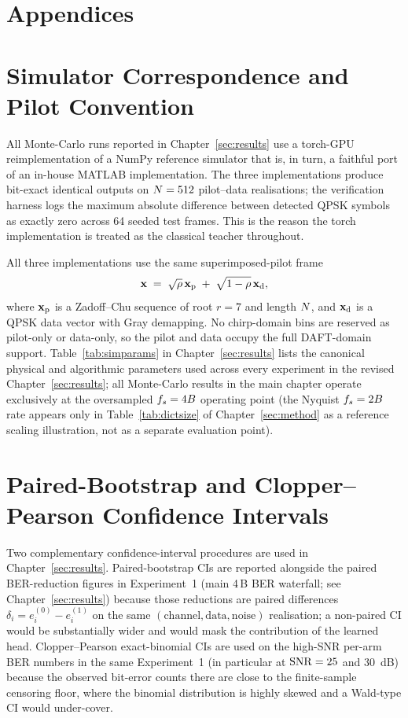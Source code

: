 \section*{Appendices}

\renewcommand{\thesection}{\Alph{section}}
\setcounter{section}{0}

\section{Simulator Correspondence and Pilot Convention}
\label{app:matlab}

All Monte-Carlo runs reported in Chapter~\ref{sec:results} use a torch-GPU reimplementation of a NumPy reference simulator that is, in turn, a faithful port of an in-house MATLAB implementation.
The three implementations produce bit-exact identical outputs on $N = 512$ pilot--data realisations; the verification harness logs the maximum absolute difference between detected QPSK symbols as exactly zero across 64 seeded test frames.
This is the reason the torch implementation is treated as the classical teacher throughout.

All three implementations use the same superimposed-pilot frame
\begin{equation*}
\mathbf{x} \;=\; \sqrt{\rho}\,\mathbf{x}_{\mathrm{p}} \;+\; \sqrt{1 - \rho}\,\mathbf{x}_{\mathrm{d}},
\end{equation*}
where $\mathbf{x}_{\mathrm{p}}$ is a Zadoff--Chu sequence of root $r = 7$ and length $N$, and $\mathbf{x}_{\mathrm{d}}$ is a QPSK data vector with Gray demapping.
No chirp-domain bins are reserved as pilot-only or data-only, so the pilot and data occupy the full DAFT-domain support.
Table~\ref{tab:simparams} in Chapter~\ref{sec:results} lists the canonical physical and algorithmic parameters used across every experiment in the revised Chapter~\ref{sec:results}; all Monte-Carlo results in the main chapter operate exclusively at the oversampled $f_s = 4B$ operating point (the Nyquist $f_s = 2B$ rate appears only in Table~\ref{tab:dictsize} of Chapter~\ref{sec:method} as a reference scaling illustration, not as a separate evaluation point).

\section{Paired-Bootstrap and Clopper--Pearson Confidence Intervals}
\label{app:ci}

Two complementary confidence-interval procedures are used in Chapter~\ref{sec:results}.
Paired-bootstrap CIs are reported alongside the paired BER-reduction figures in Experiment~1 (main 4\,B BER waterfall; see Chapter~\ref{sec:results}) because those reductions are paired differences $\delta_i = e^{(0)}_i - e^{(1)}_i$ on the same $(\mathrm{channel},\mathrm{data},\mathrm{noise})$ realisation; a non-paired CI would be substantially wider and would mask the contribution of the learned head.
Clopper--Pearson exact-binomial CIs are used on the high-SNR per-arm BER numbers in the same Experiment~1 (in particular at $\mathrm{SNR} = 25$ and $30$~dB) because the observed bit-error counts there are close to the finite-sample censoring floor, where the binomial distribution is highly skewed and a Wald-type CI would under-cover.

